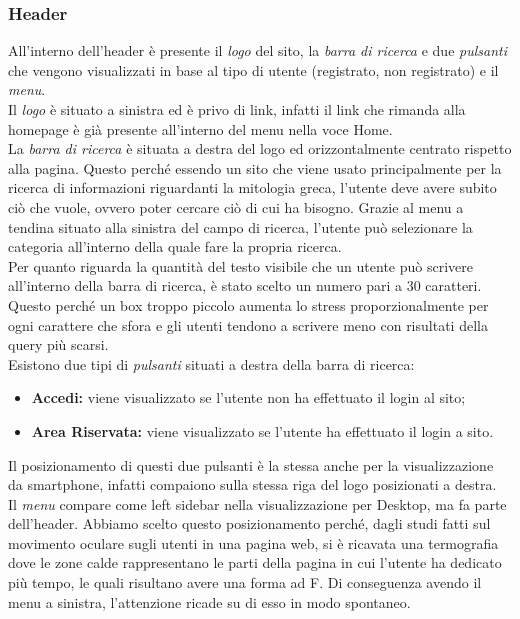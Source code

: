 \subsubsection{Header} \label{subsection:header}
All'interno dell'header è presente il \textit{logo} del sito, la \textit{barra di ricerca} e due \textit{pulsanti} che vengono visualizzati in base al tipo di utente (registrato, non registrato) e il \textit{menu}.\\
Il \textit{logo} è situato a sinistra ed è privo di link, infatti il link che rimanda alla homepage è già presente all'interno del menu nella voce Home.\\
La \textit{barra di ricerca} è situata a destra del logo ed orizzontalmente centrato rispetto alla pagina. Questo perché essendo un sito che viene usato principalmente per la ricerca di informazioni riguardanti la mitologia greca, l'utente deve avere subito ciò che vuole, ovvero poter cercare ciò di cui ha bisogno. Grazie al menu a tendina situato alla sinistra del campo di ricerca, l'utente può selezionare la categoria all'interno della quale fare la propria ricerca.\\
Per quanto riguarda la quantità del testo visibile che un utente può scrivere all'interno della barra di ricerca, è stato scelto un numero pari a 30 caratteri. Questo perché un box troppo piccolo aumenta lo stress proporzionalmente per ogni carattere che sfora e gli utenti tendono a scrivere meno con risultati della query più scarsi.\\
Esistono due tipi di \textit{pulsanti} situati a destra della barra di ricerca:
\begin{itemize}
	\item \textbf{Accedi:} viene visualizzato se l'utente non ha effettuato il login al sito;
	\item \textbf{Area Riservata:} viene visualizzato se l'utente ha effettuato il login a sito.
\end{itemize}
Il posizionamento di questi due pulsanti è la stessa anche per la visualizzazione da smartphone, infatti compaiono sulla stessa riga del logo posizionati a destra.\\
Il \textit{menu} compare come left sidebar nella visualizzazione per Desktop, ma fa parte dell'header. Abbiamo scelto questo posizionamento perché, dagli studi fatti sul movimento oculare sugli utenti in una pagina web, si è ricavata una termografia dove le zone calde rappresentano le parti della pagina in cui l'utente ha dedicato più tempo, le quali risultano avere una forma ad F. Di conseguenza avendo il menu a sinistra, l'attenzione ricade su di esso in modo spontaneo.\\

